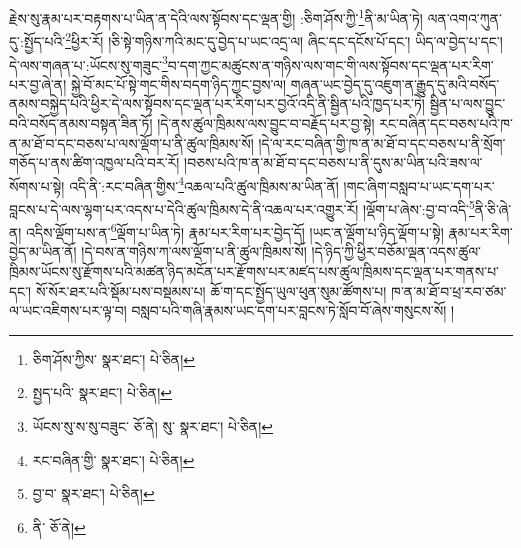 རྗེས་སུ་རྣམ་པར་བརྟགས་པ་ཡིན་ན་དེའི་ལས་སྟོབས་དང་ལྡན་གྱི། :ཅིག་ཤོས་ཀྱི་\footnote{ཅིག་ཤོས་ཀྱིས་  སྣར་ཐང་།  པེ་ཅིན། }ནི་མ་ཡིན་ཏེ། ལན་འགའ་ཀུན་དུ་:སྤྱོད་པའི་\footnote{སྤྱད་པའི་  སྣར་ཐང་།  པེ་ཅིན། }ཕྱིར་རོ། །ཅི་སྟེ་གཉིས་ཀའི་མང་དུ་བྱེད་པ་ཡང་འདྲ་ལ། ཞིང་དང་དངོས་པོ་དང་། ཡིད་ལ་བྱེད་པ་དང་། དེ་ལས་གཞན་པ་:ཡོངས་སུ་གཟུང་\footnote{ཡོངས་སུ་ས་སུ་བཟུང་  ཅོ་ནེ། སུ་  སྣར་ཐང་།  པེ་ཅིན། }བ་དག་ཀྱང་མཚུངས་ན་གཉིས་ལས་གང་གི་ལས་སྟོབས་དང་ལྡན་པར་རིག་པར་བྱ་ཞེ་ན། སྐྱེ་བོ་མང་པོ་སྟེ་གང་གིས་བདག་ཉིད་ཀྱང་བྱས་ལ། གཞན་ཡང་བྱེད་དུ་འཇུག་ན་རྒྱུད་དུ་མའི་བསོད་ནམས་བསྐྱེད་པའི་ཕྱིར་དེ་ལས་སྟོབས་དང་ལྡན་པར་རིག་པར་བྱའོ་འདི་ནི་སྦྱིན་པའི་ཁྱད་པར་ཏེ། སྦྱིན་པ་ལས་བྱུང་བའི་བསོད་ནམས་བསྟན་ཟིན་ཏོ། །དེ་ནས་ཚུལ་ཁྲིམས་ལས་བྱུང་བ་བརྗོད་པར་བྱ་སྟེ། རང་བཞིན་དང་བཅས་པའི་ཁ་ན་མ་ཐོ་བ་དང་བཅས་པ་ལས་ལྡོག་པ་ནི་ཚུལ་ཁྲིམས་སོ། །དེ་ལ་རང་བཞིན་གྱི་ཁ་ན་མ་ཐོ་བ་དང་བཅས་པ་ནི་སྲོག་གཅོད་པ་ནས་ཚིག་འཁྱལ་པའི་བར་རོ། །བཅས་པའི་ཁ་ན་མ་ཐོ་བ་དང་བཅས་པ་ནི་དུས་མ་ཡིན་པའི་ཟས་ལ་སོགས་པ་སྟེ། འདི་ནི་:རང་བཞིན་གྱིས་\footnote{རང་བཞིན་གྱི་  སྣར་ཐང་།  པེ་ཅིན། }འཆལ་པའི་ཚུལ་ཁྲིམས་མ་ཡིན་ནོ། །གང་ཞིག་བསླབ་པ་ཡང་དག་པར་བླངས་པ་དེ་ལས་ལྷག་པར་འདས་པ་དེའི་ཚུལ་ཁྲིམས་དེ་ནི་འཆལ་པར་འགྱུར་རོ། །ལྡོག་པ་ཞེས་:བྱ་བ་འདི་\footnote{བྱ་བ་  སྣར་ཐང་།  པེ་ཅིན། }ནི་ཅི་ཞེ་ན། འདིས་ལྡོག་པས་ན་\footnote{ནི་  ཅོ་ནེ། }ལྡོག་པ་ཡིན་ཏེ། རྣམ་པར་རིག་པར་བྱེད་དོ། །ཡང་ན་ལྡོག་པ་ཉིད་ལྡོག་པ་སྟེ། རྣམ་པར་རིག་བྱེད་མ་ཡིན་ནོ། །དེ་བས་ན་གཉིས་ཀ་ལས་ལྡོག་པ་ནི་ཚུལ་ཁྲིམས་སོ། །དེ་ཉིད་ཀྱི་ཕྱིར་བཅོམ་ལྡན་འདས་ཚུལ་ཁྲིམས་ཡོངས་སུ་རྫོགས་པའི་མཚན་ཉིད་མངོན་པར་རྫོགས་པར་མཛད་པས་ཚུལ་ཁྲིམས་དང་ལྡན་པར་གནས་པ་དང་། སོ་སོར་ཐར་པའི་སྡོམ་པས་བསྡམས་པ། ཆོ་ག་དང་སྤྱོད་ཡུལ་ཕུན་སུམ་ཚོགས་པ། ཁ་ན་མ་ཐོ་བ་ཕྲ་རབ་ཙམ་ལ་ཡང་འཇིགས་པར་ལྟ་བ། བསླབ་པའི་གཞི་རྣམས་ཡང་དག་པར་བླངས་ཏེ་སློབ་བོ་ཞེས་གསུངས་སོ། །

